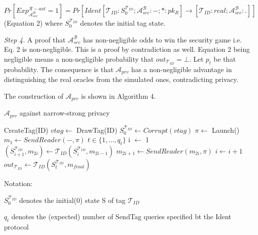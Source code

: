     $Pr[Exp_{\mathcal{A}_{sec}^{B}}^{\mathcal{R}-aut} = 1] = Pr[Ident[\mathcal{T}_{ID}:S_0^{\mathcal{T}_{ID}}; \mathcal{A}_{sec}^{\mathcal{B}}:-; *:pk_{R}]
    \rightarrow [\mathcal{T}_{ID}:real; \mathcal{A}_{sec}^{\mathcal{B}}:.]]$ (Equation 2) where $S_0^{\mathcal{T}_{ID}}$ denotes the initial tag state.
    
    \textit{Step 4.} A proof that $\mathcal{A}_{sec}^{\mathcal{B}}$ has non-negligible odds to win the security game i.e. Eq. 2 is non-negligible.
    This is a proof by contradiction as well. Equation 2 being negligible means a non-negligible probability that $out_{\mathcal{T}_{ID}} = \bot$.
    Let $p_t$ be that probability. The consequence is that $\mathcal{A}_{prv}$ has a non-negligible advantage in distinguishing the real oracles 
    from the simulated ones, contradicting privacy.

    The construction of $\mathcal{A}_{prv}$ is shown in Algorithm 4.
    
    \begin{algorithm}[H] %
        \centering
        \caption{$\mathcal{A}_{prv}$ against narrow-strong privacy}
        \begin{algorithmic}[1] %
            \State CreateTag(ID)
            \State $vtag \leftarrow$ DrawTag(ID)
            \State $S_0^{\mathcal{T}_{ID}} \gets Corrupt(vtag)$
            \State $\pi \leftarrow$ Launch() 
            \State $m_1 \leftarrow SendReader(-,\pi)$ 
            \State $t \in \{1, ..., q_t\}$
            \State i $\leftarrow$ 1
                \State $(S_{i+1}^{\mathcal{T}_{ID}}, m_{2i}) \gets 
                    \mathcal{T}_{ID}(S_{i}^{\mathcal{T}_{ID}}, m_{2i-1})$ 
                \State $m_{2i+1} \gets SendReader(m_{2i}, \pi)$
                \State $i \gets i+1$
            \EndWhile
            \State $out_{\mathcal{T}_{ID}} \gets \mathcal{T}_{ID}(S_t^{\mathcal{T}_{ID}}, m_{final})$
                \State {}
            \Else
                \State {}
            \EndIf
        \end{algorithmic}
    \end{algorithm}

    Notation: 

    $S_0^{\mathcal{T}_{ID}}$ denotes the initial(0) state S of tag $\mathcal{T}_{ID}$

    $q_t$ denotes the (expected) number of SendTag queries specified bt the Ident protocol

